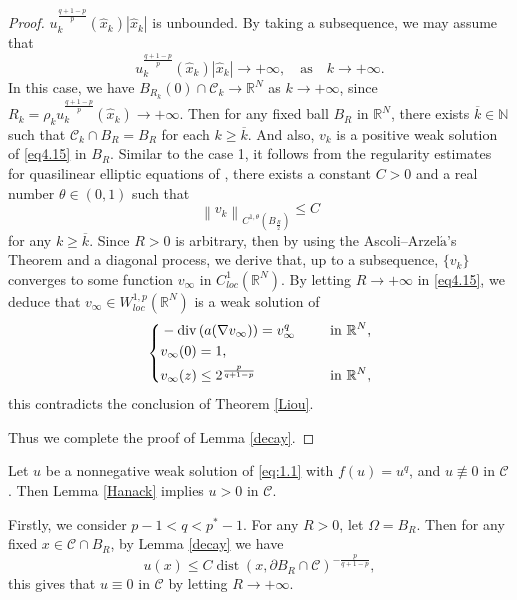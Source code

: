 \documentclass[12pt]{amsart}
\theoremstyle{definition}
\theoremstyle{remark}
\theoremstyle{conclusion}
\theoremstyle{conjecture}
\numberwithin{equation}{section}
\begin{document}
\begin{proof}
\smallskip

 $u_k^{\frac{q+1-p}{p}}(\widehat{x}_k)|\widehat{x}_k|$ is unbounded. By taking a subsequence, we may assume that
$$u_k^{\frac{q+1-p}{p}}(\widehat{x}_k)|\widehat{x}_k|\rightarrow+\infty,\quad \text{as}\quad k\rightarrow+\infty.$$
 In this case, we have  $B_{R_k}(0)\cap\mathcal{C}_k\rightarrow\mathbb{R}^N$ as $k\rightarrow+\infty$, since $R_k=\rho_ku_k^{\frac{q+1-p}{p}}(\widehat{x}_k)\rightarrow+\infty$. Then for any fixed ball $B_R$ in $\mathbb{R}^N$, there exists $\overline{k}\in\mathbb{N}$ such that
 $\mathcal{C}_k\cap B_R=B_R$ for each $k\geq\overline{k}$. And also, $v_k$ is a positive weak solution of \eqref{eq4.15} in $B_R$. Similar to the case 1, it follows from the regularity estimates for quasilinear elliptic equations of \cite{Dib}, there exists a constant $C>0$ and a real number $\theta\in(0,1)$ such that
 $$\left\lVert v_k\right\rVert _{C^{1,\theta}(B_{\frac{R}{2}})}\leq C $$
 for any $k\geq\overline{k}$. Since $R>0$ is arbitrary, then by using the Ascoli--Arzel$\acute{\text{a}} $'s Theorem and a diagonal process, we derive that, up to
 a subsequence, $\{v_k\}$ converges to some function $v_{\infty}$ in $ C^1_{loc}(\mathbb{R}^N)$. By letting $R\rightarrow+\infty$ in \eqref{eq4.15}, we deduce that $v_{\infty}\in W^{1,p}_{loc}(\mathbb{R}^N)$ is a weak solution of
\begin{equation*}
    \left\{
        \begin{aligned}
        &-\operatorname{div}\left(a(\nabla v_{\infty})\right)=v_{\infty}^{q} \quad\,\,\, &{\rm{in}} \,\, \mathbb{R}^N, \\
        &v_{\infty}(0)=1,\\
        &v_{\infty}(z)\leq 2^{\frac{p}{q+1-p}} \quad\,\,\, &{\rm{in}} \,\, \mathbb{R}^N,
        \end{aligned}
        \right.
\end{equation*}
this contradicts the conclusion of Theorem \ref{Liou}.

Thus we complete the proof of Lemma \ref{decay}.
\end{proof}

 Let $u$ be a nonnegative weak solution of \eqref{eq:1.1} with $f(u)=u^{q}$, and $u\not\equiv0$ in $\mathcal{C}$. Then Lemma \ref{Hanack} implies $u>0$ in $\mathcal{C}$.

Firstly, we consider $p-1<q<p^*-1$. For any $R>0$, let $\Omega=B_R$. Then for any fixed $x\in\mathcal{C}\cap B_R$, by Lemma \ref{decay} we have
$$u(x)\leq C\operatorname{dist}(x,\partial B_R\cap\mathcal{C})^{-\frac{p}{q+1-p}},$$
this gives that $u\equiv0$ in $\mathcal{C}$ by letting $R\rightarrow+\infty$.
\end{document}
